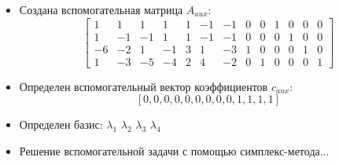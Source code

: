 \begin{itemize}
\subsection*{Поиск начального базиса методом введения искуственных переменных.}
\item Создана вспомогательная матрица $A_{aux}$:
$$\left[\begin{array}{ccccccccccccc}1 & 1 & 1 & 1 & 1 & -1 & -1 & 0 & 0 & 1 & 0 & 0 & 0\\1 & -1 & -1 & 1 & 1 & -1 & -1 & 0 & 0 & 0 & 1 & 0 & 0\\-6 & -2 & 1 & -1 & 3 & 1 & -3 & 1 & 0 & 0 & 0 & 1 & 0\\1 & -3 & -5 & -4 & 2 & 4 & -2 & 0 & 1 & 0 & 0 & 0 & 1\end{array}\right]$$
\item Определен вспомогательный вектор коэффициентов $c_{aux}$:
$$[0, 0, 0, 0, 0, 0, 0, 0, 0, 1, 1, 1, 1]$$
\item Определен базис:
$\lambda_1$
$\lambda_2$
$\lambda_3$
$\lambda_4$
\item Решение вспомогательной задачи с помощью симплекс-метода...

\end{itemize}
